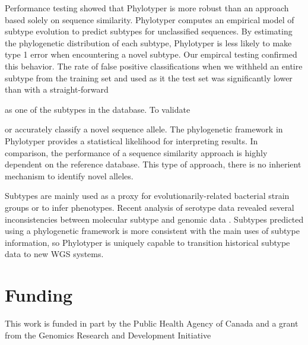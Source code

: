 \documentclass{bioinfo}
\begin{document}
Performance testing showed that Phylotyper is more robust than an approach based solely on sequence similarity.
Phylotyper computes an empirical model of subtype evolution to predict subtypes for unclassified sequences.
By estimating the phylogenetic distribution of each subtype, Phylotyper is less likely to make type 1 error when encountering a novel subtype. Our empircal testing confirmed this behavior. 
The rate of false positive classifications when we withheld an entire subtype from the training set and used as it the test set was significantly lower than with a straight-forward 

 as one of the subtypes in the database. To validate



or accurately classify a novel sequence allele.
The phylogenetic framework in Phylotyper provides a statistical likelihood for interpreting results.
In comparison, the performance of a sequence similarity approach is highly dependent on the reference database.
This type of approach, there is no inherient mechanism to identify novel alleles.

Subtypes are mainly used as a proxy for evolutionarily-related bacterial strain groups or to infer phenotypes.
Recent analysis of serotype data revealed several inconsistencies between molecular subtype and genomic data \citep{DebRoy2016}.
Subtypes predicted using a phylogenetic framework is more consistent with the main uses of subtype information, so 
Phylotyper is uniquely capable to transition historical subtype data to new WGS systems.\vspace*{-10pt}

\section*{Funding}

This work is funded in part by the Public Health Agency of Canada and a grant from the Genomics Research and Development Initiative\vspace*{-12pt}




\end{document}
